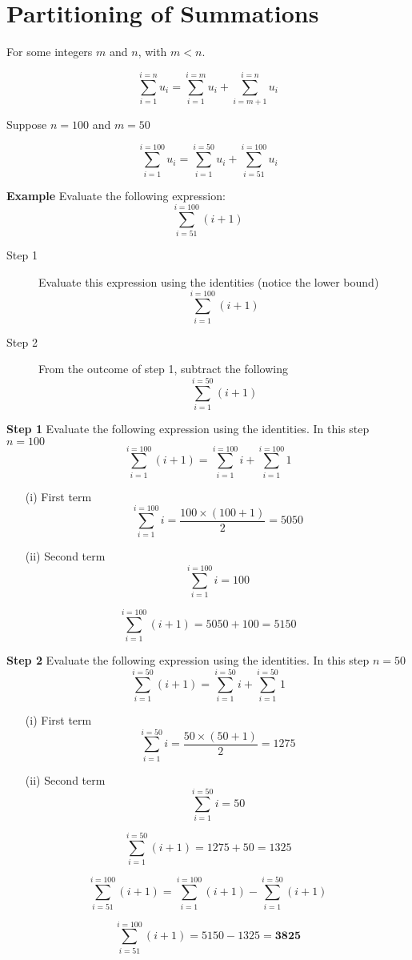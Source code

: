 



\section{Partitioning of Summations}


For some integers $m$ and $n$, with $m<n$.

\[ \sum^{i=n}_{i=1} u_{i} = \sum^{i=m}_{i=1} u_{i} + \sum^{i=n}_{i=m+1} u_{i}\]

Suppose $n=100$ and $m=50$

\[ \sum^{i=100}_{i=1} u_{i} = \sum^{i=50}_{i=1} u_{i} + \sum^{i=100}_{i=51} u_{i}\]



\textbf{Example}
Evaluate the following expression:
\[ \sum^{i=100}_{i=51} (i+1) \]

\begin{description}
\item[Step 1] Evaluate this expression using the identities (notice the lower bound)
\[ \sum^{i=100}_{i=1} (i+1) \]
\item[Step 2] From the outcome of step 1, subtract the following
\[ \sum^{i=50}_{i=1} (i+1) \]
\end{description}



\textbf{Step 1} Evaluate the following expression using the identities. In this step $n=100$
\[ \sum^{i=100}_{i=1} (i+1)  = \sum^{i=100}_{i=1} i  +  \sum^{i=100}_{i=1} 1  \]

\begin{itemize}
\item[(i)] First term \[\sum^{i=100}_{i=1} i  = \frac{100\times(100+1)}{2}  = 5050\]

\item[(ii)] Second term \[ \sum^{i=100}_{i=1} i  =  100\]
\end{itemize}

\[ \sum^{i=100}_{i=1} (i+1)  = 5050 + 100 = 5150 \]




\textbf{Step 2} Evaluate the following expression using the identities. In this step $n=50$
\[ \sum^{i=50}_{i=1} (i+1)  = \sum^{i=50}_{i=1} i  +  \sum^{i=50}_{i=1} 1  \]

\begin{itemize}
\item[(i)] First term \[\sum^{i=50}_{i=1} i  = \frac{50\times(50+1)}{2}  = 1275\]

\item[(ii)] Second term \[ \sum^{i=50}_{i=1} i  =  50\]
\end{itemize}

\[ \sum^{i=50}_{i=1} (i+1)  = 1275 + 50 = 1325 \]


\[ \sum^{i=100}_{i=51} (i+1) = \sum^{i=100}_{i=1} (i+1)  - \sum^{i=50}_{i=1}(i+1)   \]

\[ \sum^{i=100}_{i=51} (i+1)  = 5150 - 1325 =\boldsymbol{3825} \]




